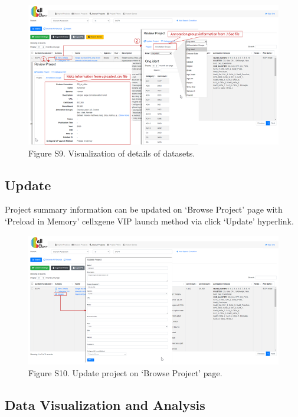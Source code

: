 \documentclass[
]{book}
\begin{document}
\begin{figure}
\centering
\includegraphics{figures/S9.png}
\caption{Figure S9. Visualization of details of datasets.}
\end{figure}

\hypertarget{update}{%
\subsection{Update}\label{update}}

Project summary information can be updated on `Browse Project' page with `Preload in Memory' cellxgene VIP launch method via click `Update' hyperlink.

\begin{figure}
\centering
\includegraphics{figures/s10.png}
\caption{Figure S10. Update project on `Browse Project' page.}
\end{figure}

\hypertarget{data-visualization-and-analysis}{%
\subsection{Data Visualization and Analysis}\label{data-visualization-and-analysis}}
\end{document}
